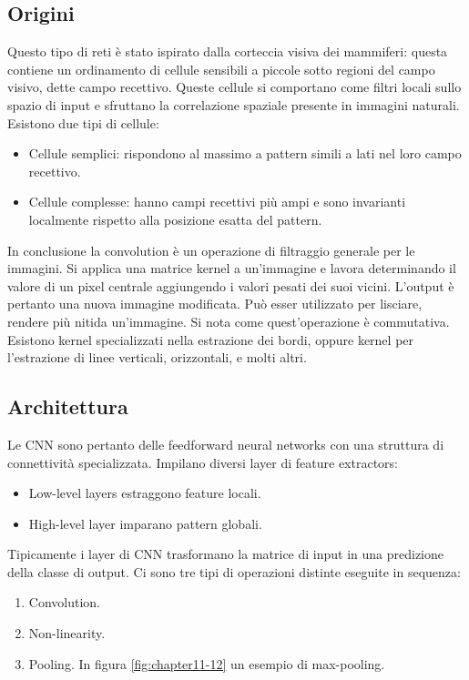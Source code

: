 	\subsection{Origini}
	Questo tipo di reti \`e stato ispirato dalla corteccia visiva dei mammiferi: questa contiene un ordinamento di cellule sensibili a piccole sotto regioni del campo visivo, dette campo recettivo.
	Queste cellule si comportano come filtri locali sullo spazio di input e sfruttano la correlazione spaziale presente in immagini naturali.
	Esistono due tipi di cellule:
	\begin{multicols}{2}
		\begin{itemize}
			\item Cellule semplici: rispondono al massimo a pattern simili a lati nel loro campo recettivo.
			\item Cellule complesse: hanno campi recettivi pi\`u ampi e sono invarianti localmente rispetto alla posizione esatta del pattern.
		\end{itemize}
	\end{multicols}
	In conclusione la convolution \`e un operazione di filtraggio generale per le immagini.
	Si applica una matrice kernel a un'immagine e lavora determinando il valore di un pixel centrale aggiungendo i valori pesati dei suoi vicini.
	L'output \`e pertanto una nuova immagine modificata.
	Pu\`o esser utilizzato per lisciare, rendere pi\`u nitida un'immagine.
	Si nota come quest'operazione \`e commutativa.
	Esistono kernel specializzati nella estrazione dei bordi, oppure kernel per l'estrazione di linee verticali, orizzontali, e molti altri.
	
	\subsection{Architettura}
	Le CNN sono pertanto delle feedforward neural networks con una struttura di connettivit\`a specializzata.
	Impilano diversi layer di feature extractors:
	\begin{multicols}{2}
		\begin{itemize}
			\item Low-level layers estraggono feature locali.
			\item High-level layer imparano pattern globali.
		\end{itemize}
	\end{multicols}
	Tipicamente i layer di CNN trasformano la matrice di input in una predizione della classe di output.
	Ci sono tre tipi di operazioni distinte eseguite in sequenza:
	\begin{multicols}{2}
		\begin{enumerate}
			\item Convolution.
			\item Non-linearity.
			\item Pooling. In figura \ref{fig:chapter11-12} un esempio di max-pooling.
		\end{enumerate}
	\end{multicols}
	
